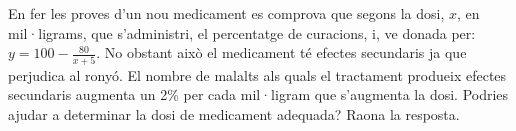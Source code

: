 \begin{mylist}
	
	\exer En fer les proves d'un nou medicament es comprova que segons la dosi, $x$, en mil·ligrams, que s'administri, el percentatge de curacions, i, ve donada per: $y = 100 - \frac{80}{x + 5}$. No obstant això el medicament té efectes secundaris ja que perjudica al ronyó. El nombre de malalts als quals el tractament produeix efectes secundaris augmenta un 2\% per cada mil·ligram que s'augmenta la dosi. Podries ajudar a determinar la dosi de medicament adequada? Raona la resposta.
	

\end{mylist}
